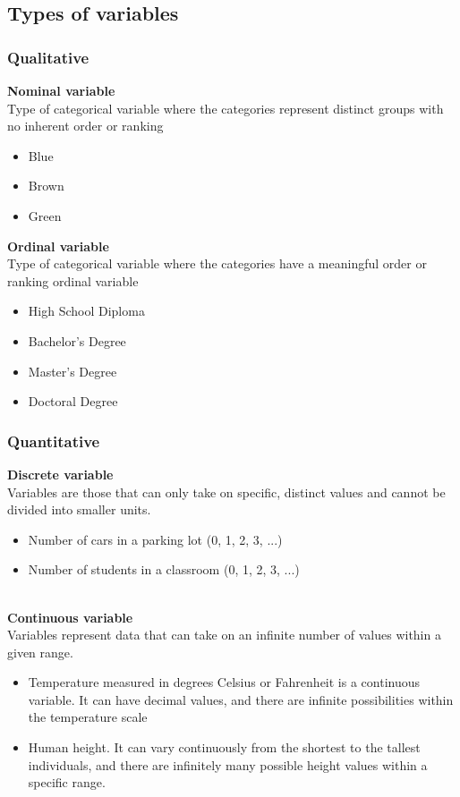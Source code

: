\documentclass[a4paper,10pt,onecolumn]{article}
\begin{document}
\subsection{Types of variables}
\begin{multicols}{2}
\subsubsection{Qualitative}
\textbf{Nominal variable}
\\Type of categorical variable where the categories represent distinct groups with no inherent order or ranking
\begin{itemize}
   \item Blue
  \item Brown
  \item Green

\end{itemize}
\textbf{Ordinal variable}
\\Type of categorical variable where the categories have a meaningful order or ranking
ordinal variable 
\begin{itemize}
  \item High School Diploma
  \item Bachelor's Degree
  \item Master's Degree 
  \item Doctoral Degree 
\end{itemize}
\columnbreak
\subsubsection{Quantitative}
\textbf{Discrete variable}
\\Variables are those that can only take on specific, distinct values and cannot be divided into smaller units.
\begin{itemize}
    \item Number of cars in a parking lot (0, 1, 2, 3, ...)
\item Number of students in a classroom (0, 1, 2, 3, ...)
\end{itemize}
\\\textbf{Continuous variable}
\\Variables represent data that can take on an infinite number of values within a given range.
\begin{itemize}
    \item Temperature measured in degrees Celsius or Fahrenheit is a continuous variable. It can have decimal values, and there are infinite possibilities within the temperature scale
\item Human height. It can vary continuously from the shortest to the tallest individuals, and there are infinitely many possible height values within a specific range.
\end{itemize}
\end{multicols}
\end{document}
